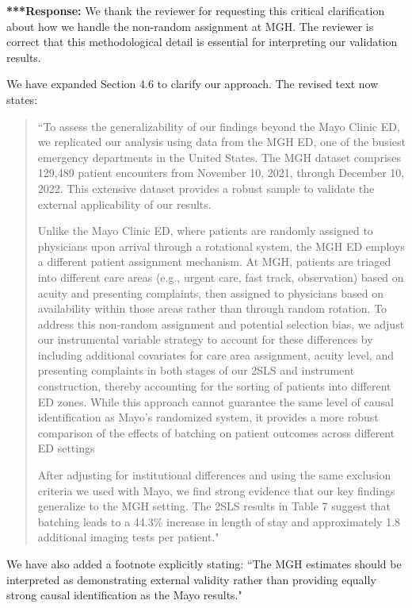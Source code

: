 \documentclass[11pt]{article}
\newcommand{\1}{\hbox{\rm 1\kern-.35em 1}}
\begin{document}
{{{\noindent\textbf{***Response:} \color{blue} We thank the reviewer for requesting this critical clarification about how we handle the non-random assignment at MGH. The reviewer is correct that this methodological detail is essential for interpreting our validation results.

We have expanded Section 4.6 to clarify our approach. The revised text now states:

\begin{quote}
    ``To assess the generalizability of our findings beyond the Mayo Clinic ED, we replicated our analysis using data from the MGH ED, one of the busiest emergency departments in the United States. The MGH dataset comprises 129,489 patient encounters from November 10, 2021, through December 10, 2022. This extensive dataset provides a robust sample to validate the external applicability of our results.
    
    Unlike the Mayo Clinic ED, where patients are randomly assigned to physicians upon arrival through a rotational system, the MGH ED employs a different patient assignment mechanism. At MGH, patients are triaged into different care areas (e.g., urgent care, fast track, observation) based on acuity and presenting complaints, then assigned to physicians based on availability within those areas rather than through random rotation. To address this non-random assignment and potential selection bias, we adjust our instrumental variable strategy to account for these differences by including additional covariates for care area assignment, acuity level, and presenting complaints in both stages of our 2SLS and instrument construction, thereby accounting for the sorting of patients into different ED zones. While this approach cannot guarantee the same level of causal identification as Mayo's randomized system, it provides a more robust comparison of the effects of batching on patient outcomes across different ED settings
    
    After adjusting for institutional differences and using the same exclusion criteria we used with Mayo, we find strong evidence that our key findings generalize to the MGH setting. The 2SLS results in Table 7 suggest that batching leads to a 44.3\% increase in length of stay and approximately 1.8 additional imaging tests per patient."
\end{quote}

We have also added a footnote explicitly stating: ``The MGH estimates should be interpreted as demonstrating external validity rather than providing equally strong causal identification as the Mayo results."

}}}
\end{document}
